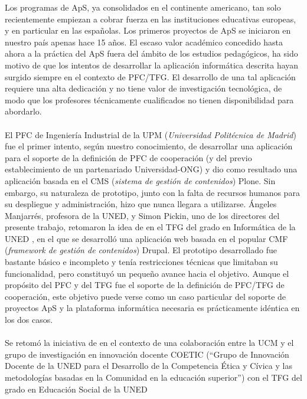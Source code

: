 \documentclass[11pt]{book}
\begin{document}
	Los programas de ApS, ya consolidados en el continente americano, tan
	solo recientemente empiezan a cobrar fuerza en las instituciones
	educativas europeas, y en particular en las españolas. Los primeros
	proyectos de ApS se iniciaron en nuestro país apenas hace 15 años.  El
	escaso valor académico concedido hasta ahora a la práctica del ApS fuera
	del ámbito de los estudios pedagógicos, ha sido motivo de que los
	intentos de desarrollar la aplicación informática descrita hayan surgido
	siempre en el contexto de PFC/TFG. El desarrollo de una tal aplicación
	requiere una alta dedicación y no tiene valor de investigación
	tecnológica, de modo que los profesores técnicamente cualificados no
	tienen disponibilidad para abordarlo.\\\\	
	El PFC de Ingeniería Industrial de la
	UPM (\emph{Universidad Politécnica de Madrid}) \cite{ref1} fue el primer intento, según
	nuestro conocimiento, de desarrollar una aplicación para el soporte de
	la definición de PFC de cooperación (y del previo establecimiento de un
	partenariado Universidad-ONG) y dio como resultado una aplicación basada
	en el CMS (\emph{sistema de gestión de contenidos}) Plone. Sin embargo, su
	naturaleza de prototipo, junto con la falta de recursos humanos para su
	despliegue y administración, hizo que nunca llegara a utilizarse.
	Ángeles Manjarrés, profesora de la UNED, y Simon Pickin, uno de los directores del presente
	trabajo, retomaron la idea de \cite{ref1} en el TFG del grado en Informática de
	la UNED \cite{ref2}, en el que se desarrolló una aplicación web basada en el
	popular CMF (\emph{framework de gestión de contenidos}) Drupal. El prototipo
	desarrollado fue bastante básico e incompleto y tenía restricciones
	técnicas que limitaban su funcionalidad, pero constituyó un pequeño
	avance hacia el objetivo. Aunque el propósito del PFC \cite{ref1} y del TFG \cite{ref2}
	fue el soporte de la definición de PFC/TFG de cooperación, este objetivo
	puede verse como un caso particular del soporte de proyectos ApS y la
	plataforma informática necesaria es prácticamente idéntica en los dos casos.\\\\
	Se retomó la iniciativa de \cite{ref2} en el contexto de una colaboración entre
	la UCM y el grupo de investigación en innovación docente COETIC (“Grupo
	de Innovación Docente de la UNED para el Desarrollo de la Competencia
	Ética y Cívica y las metodologías basadas en la Comunidad en la
	educación superior”) con el TFG del grado en Educación Social de la UNED
\end{document}
